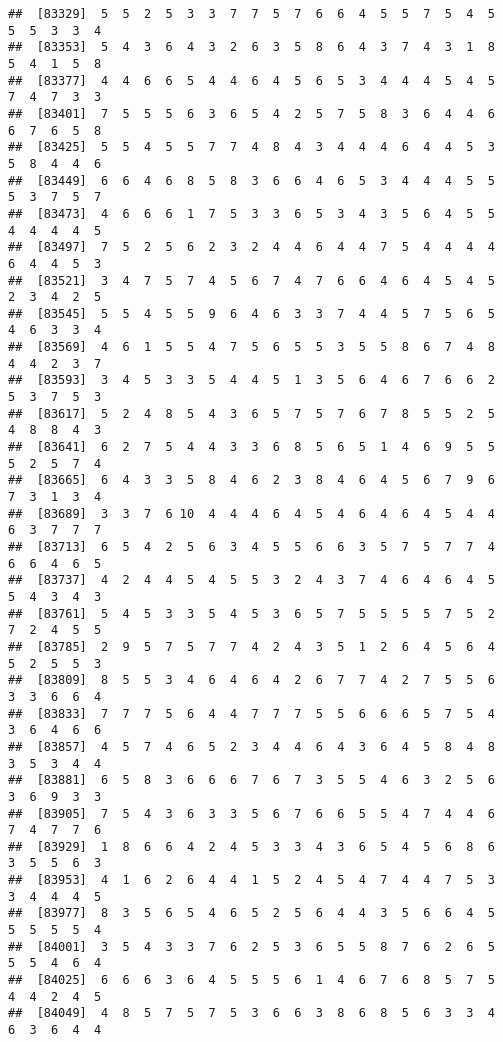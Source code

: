 \documentclass[
]{book}
\begin{document}
\begin{verbatim}
##  [83329]  5  5  2  5  3  3  7  7  5  7  6  6  4  5  5  7  5  4  5  5  5  3  3  4
##  [83353]  5  4  3  6  4  3  2  6  3  5  8  6  4  3  7  4  3  1  8  5  4  1  5  8
##  [83377]  4  4  6  6  5  4  4  6  4  5  6  5  3  4  4  4  5  4  5  7  4  7  3  3
##  [83401]  7  5  5  5  6  3  6  5  4  2  5  7  5  8  3  6  4  4  6  6  7  6  5  8
##  [83425]  5  5  4  5  5  7  7  4  8  4  3  4  4  4  6  4  4  5  3  5  8  4  4  6
##  [83449]  6  6  4  6  8  5  8  3  6  6  4  6  5  3  4  4  4  5  5  5  3  7  5  7
##  [83473]  4  6  6  6  1  7  5  3  3  6  5  3  4  3  5  6  4  5  5  4  4  4  4  5
##  [83497]  7  5  2  5  6  2  3  2  4  4  6  4  4  7  5  4  4  4  4  6  4  4  5  3
##  [83521]  3  4  7  5  7  4  5  6  7  4  7  6  6  4  6  4  5  4  5  2  3  4  2  5
##  [83545]  5  5  4  5  5  9  6  4  6  3  3  7  4  4  5  7  5  6  5  4  6  3  3  4
##  [83569]  4  6  1  5  5  4  7  5  6  5  5  3  5  5  8  6  7  4  8  4  4  2  3  7
##  [83593]  3  4  5  3  3  5  4  4  5  1  3  5  6  4  6  7  6  6  2  5  3  7  5  3
##  [83617]  5  2  4  8  5  4  3  6  5  7  5  7  6  7  8  5  5  2  5  4  8  8  4  3
##  [83641]  6  2  7  5  4  4  3  3  6  8  5  6  5  1  4  6  9  5  5  5  2  5  7  4
##  [83665]  6  4  3  3  5  8  4  6  2  3  8  4  6  4  5  6  7  9  6  7  3  1  3  4
##  [83689]  3  3  7  6 10  4  4  4  6  4  5  4  6  4  6  4  5  4  4  6  3  7  7  7
##  [83713]  6  5  4  2  5  6  3  4  5  5  6  6  3  5  7  5  7  7  4  6  6  4  6  5
##  [83737]  4  2  4  4  5  4  5  5  3  2  4  3  7  4  6  4  6  4  5  5  4  3  4  3
##  [83761]  5  4  5  3  3  5  4  5  3  6  5  7  5  5  5  5  7  5  2  7  2  4  5  5
##  [83785]  2  9  5  7  5  7  7  4  2  4  3  5  1  2  6  4  5  6  4  5  2  5  5  3
##  [83809]  8  5  5  3  4  6  4  6  4  2  6  7  7  4  2  7  5  5  6  3  3  6  6  4
##  [83833]  7  7  7  5  6  4  4  7  7  7  5  5  6  6  6  5  7  5  4  3  6  4  6  6
##  [83857]  4  5  7  4  6  5  2  3  4  4  6  4  3  6  4  5  8  4  8  3  5  3  4  4
##  [83881]  6  5  8  3  6  6  6  7  6  7  3  5  5  4  6  3  2  5  6  3  6  9  3  3
##  [83905]  7  5  4  3  6  3  3  5  6  7  6  6  5  5  4  7  4  4  6  7  4  7  7  6
##  [83929]  1  8  6  6  4  2  4  5  3  3  4  3  6  5  4  5  6  8  6  3  5  5  6  3
##  [83953]  4  1  6  2  6  4  4  1  5  2  4  5  4  7  4  4  7  5  3  3  4  4  4  5
##  [83977]  8  3  5  6  5  4  6  5  2  5  6  4  4  3  5  6  6  4  5  5  5  5  5  4
##  [84001]  3  5  4  3  3  7  6  2  5  3  6  5  5  8  7  6  2  6  5  5  5  4  6  4
##  [84025]  6  6  6  3  6  4  5  5  5  6  1  4  6  7  6  8  5  7  5  4  4  2  4  5
##  [84049]  4  8  5  7  5  7  5  3  6  6  3  8  6  8  5  6  3  3  4  6  3  6  4  4

\end{verbatim}
\end{document}
